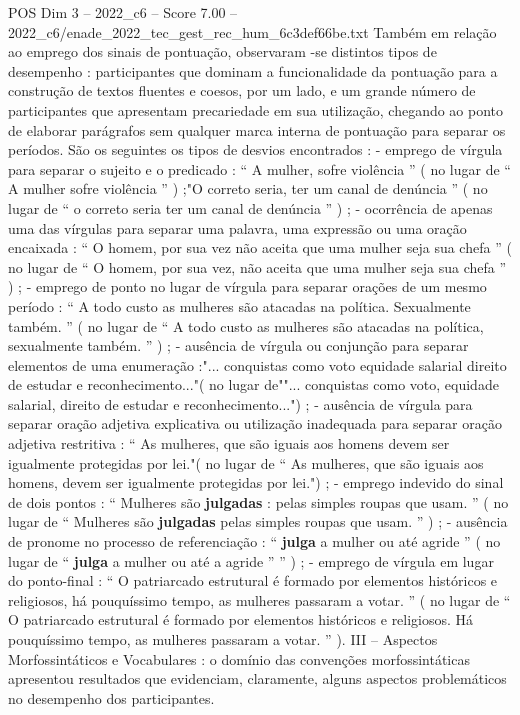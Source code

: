 \begin{textsample}{POS Dim 3 – 2022\_c6 – Score 7.00 – 2022\_c6/enade\_2022\_tec\_gest\_rec\_hum\_6c3def66be.txt}
Também em relação ao emprego dos sinais de pontuação, observaram -se distintos tipos de desempenho : participantes que dominam a funcionalidade da pontuação para a construção de textos fluentes e coesos, por um lado, e um grande número de participantes que apresentam precariedade em sua utilização, chegando ao ponto de elaborar parágrafos sem qualquer marca interna de pontuação para separar os períodos.
São os seguintes os tipos de desvios encontrados : - emprego de vírgula para separar o sujeito e o predicado : “ A mulher, sofre violência ” ( no lugar de “ A mulher sofre violência ” ) ;"O correto seria, ter um canal de denúncia ” ( no lugar de “ o correto seria ter um canal de denúncia ” ) ; - ocorrência de apenas uma das vírgulas para separar uma palavra, uma expressão ou uma oração encaixada : “ O homem, por sua vez não aceita que uma mulher seja sua chefa ” ( no lugar de “ O homem, por sua vez, não aceita que uma mulher seja sua chefa ” ) ; - emprego de ponto no lugar de vírgula para separar orações de um mesmo período : “ A todo custo as mulheres são atacadas na política.
Sexualmente também. ” ( no lugar de “ A todo custo as mulheres são atacadas na política, sexualmente também. ” ) ; - ausência de vírgula ou conjunção para separar elementos de uma enumeração :"... conquistas como voto equidade salarial direito de estudar e reconhecimento..."( no lugar de""... conquistas como voto, equidade salarial, direito de estudar e reconhecimento...") ; - ausência de vírgula para separar oração adjetiva explicativa ou utilização inadequada para separar oração adjetiva restritiva : “ As mulheres, que são iguais aos homens devem ser igualmente protegidas por lei."( no lugar de “ As mulheres, que são iguais aos homens, devem ser igualmente protegidas por lei.") ; - emprego indevido do sinal de dois pontos : “ Mulheres são \textbf{julgadas} : pelas simples roupas que usam. ” ( no lugar de “ Mulheres são \textbf{julgadas} pelas simples roupas que usam. ” ) ; - ausência de pronome no processo de referenciação : “ \textbf{julga} a mulher ou até agride ” ( no lugar de “ \textbf{julga} a mulher ou até a agride ” ” ) ; - emprego de vírgula em lugar do ponto-final : “ O patriarcado estrutural é formado por elementos históricos e religiosos, há pouquíssimo tempo, as mulheres passaram a votar. ” ( no lugar de “ O patriarcado estrutural é formado por elementos históricos e religiosos.
Há pouquíssimo tempo, as mulheres passaram a votar. ” ).
III – Aspectos Morfossintáticos e Vocabulares : o domínio das convenções morfossintáticas apresentou resultados que evidenciam, claramente, alguns aspectos problemáticos no desempenho dos participantes.

\end{textsample}
